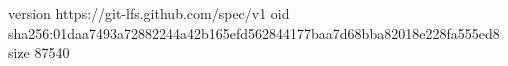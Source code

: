 version https://git-lfs.github.com/spec/v1
oid sha256:01daa7493a72882244a42b165efd562844177baa7d68bba82018e228fa555ed8
size 87540
